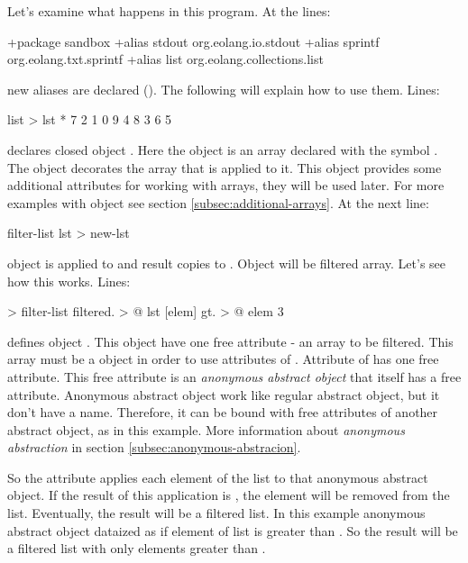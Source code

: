 \documentclass[12pt]{book}
\begin{document}
Let’s examine what happens in this program. At the lines:
\begin{ffcode}
+package sandbox
+alias stdout org.eolang.io.stdout
+alias sprintf org.eolang.txt.sprintf
+alias list org.eolang.collections.list
\end{ffcode}
new aliases are declared ().  The following will explain how to use them. Lines:
\begin{ffcode}
list > lst
  * 7 2 1 0 9 4 8 3 6 5
\end{ffcode}
declares closed object . Here the object  is an array declared with the symbol \ff{*}. The object  decorates the array that is applied to it. This object provides some additional attributes for working with arrays, they will be used later. For more examples with  object see section \ref{subsec:additional-arrays}. At the next line:
\begin{ffcode}
filter-list lst > new-lst
\end{ffcode}
object  is applied to  and result copies to .  Object  will be filtered array. Let's see how  this works.  Lines:
\begin{ffcode}
[lst] > filter-list
  filtered. > @
    lst
    [elem]
      gt. > @
        elem
        3

\end{ffcode}
defines object . This object have one free attribute - an array to be filtered. This array must be a  object in order to use attributes of . Attribute  of  has one free attribute. This free attribute is an \textit{anonymous abstract object} that itself has a free attribute. Anonymous abstract object work like regular abstract object, but it don't have a name. Therefore, it can be bound with free attributes of another abstract object, as in this example. More information about \textit{anonymous abstraction} in section \ref{subsec:anonymous-abstracion}.

So the  attribute applies each element of the list to that anonymous abstract object.  If the result of this application is , the element will be removed from the list. Eventually, the result will be a filtered list. In this example anonymous abstract object dataized as  if element of list is greater than . So the result will be a filtered list with only elements greater than .
\end{document}
